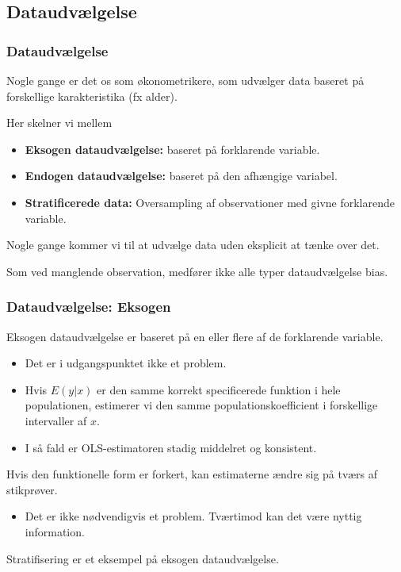 \documentclass[aspectratio=43,t]{beamer}
\begin{document}
\subsection{Dataudvælgelse}


\begin{frame}
\frametitle{Dataudvælgelse}

	Nogle gange er det os som økonometrikere, som udvælger data baseret på forskellige karakteristika (fx alder).
	
	Her skelner vi mellem
	\begin{itemize}

	\item \textbf{Eksogen dataudvælgelse:} baseret på forklarende variable.

	\item \textbf{Endogen dataudvælgelse:} baseret på den afhængige variabel.

	\item \textbf{Stratificerede data:} Oversampling af observationer med givne forklarende variable.
	
	\end{itemize}
	Nogle gange kommer vi til at udvælge data uden eksplicit at tænke over det.
	
	Som ved manglende observation, medfører ikke alle typer dataudvælgelse bias.

\end{frame}


\begin{frame}
\frametitle{Dataudvælgelse: Eksogen}

	Eksogen dataudvælgelse er baseret på en eller flere af de forklarende variable.
	\begin{itemize}
	\item Det er i udgangspunktet ikke et problem.
	
	\item Hvis $E(y|x)$ er den samme korrekt specificerede funktion i hele populationen,
			estimerer vi den samme populationskoefficient i forskellige intervaller af $x$.
			
	\item I så fald er OLS-estimatoren stadig middelret og konsistent.
	\end{itemize}	
	Hvis den funktionelle form er forkert, kan estimaterne ændre sig på tværs af stikprøver.

	\begin{itemize}	
	\item Det er ikke nødvendigvis et problem. Tværtimod kan det være nyttig information.
	\end{itemize}
	
	Stratifisering er et eksempel på eksogen dataudvælgelse.

\end{frame}
\end{document}
